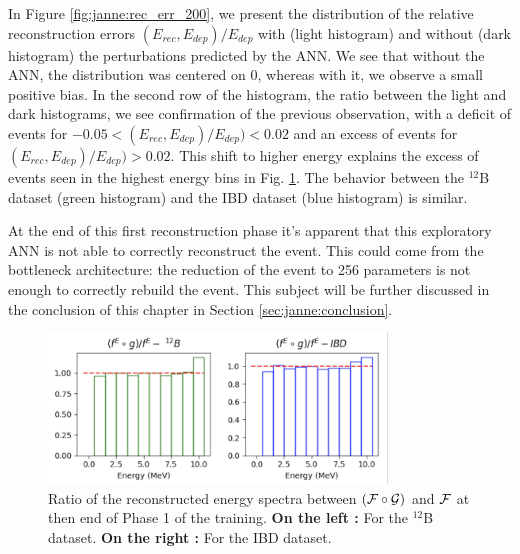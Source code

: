 \documentclass[../main.tex]{subfiles}
\begin{document}
In Figure \ref{fig:janne:rec_err_200}, we present the distribution of the relative reconstruction errors $(E_{rec}, E_{dep})/E_{dep}$ with (light histogram) and without (dark histogram) the perturbations predicted by the ANN. We see that without the ANN, the distribution was centered on 0, whereas with it, we observe a small positive bias. In the second row of the histogram, the ratio between the light and dark histograms, we see confirmation of the previous observation, with a deficit of events for $-0.05 < (E_{rec}, E_{dep})/E_{dep}) < 0.02$ and an excess of events for $(E_{rec}, E_{dep})/E_{dep}) > 0.02$. This shift to higher energy explains the excess of events seen in the highest energy bins in Fig. \ref{fig:janne:f_circ_over_f_200}. The behavior between the $^{12}$B dataset (green histogram) and the IBD dataset (blue histogram) is similar.

At the end of this first reconstruction phase it's apparent that this exploratory ANN is not able to correctly reconstruct the event. This could come from the bottleneck architecture: the reduction of the event to 256 parameters is not enough to correctly rebuild the event. This subject will be further discussed in the conclusion of this chapter in Section \ref{sec:janne:conclusion}.

\begin{figure}[!ht]
  \centering
  \includegraphics[height=4cm]{images/janne/f_circ_over_f_200.png}
  \caption{Ratio of the reconstructed energy spectra between $({\cal F} \circ {\cal G})$ and ${\cal F}$ at then end of Phase 1 of the training. \textbf{On the left :} For the $^{12}$B dataset. \textbf{On the right :} For the IBD dataset.}
  \label{fig:janne:f_circ_over_f_200}
\end{figure}
\end{document}
